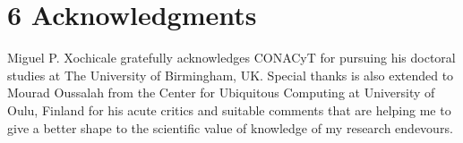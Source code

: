 \documentclass{sigchi}
\begin{document}
%
%
%
%




%
%
%


\section{6 Acknowledgments}
Miguel P. Xochicale gratefully acknowledges
CONACyT
for pursuing his doctoral studies at The University of Birmingham, UK.
Special thanks is also extended to Mourad Oussalah from the Center for
Ubiquitous Computing at University of Oulu, Finland for his acute critics
and suitable comments that are helping me to give a better shape
to the scientific value of knowledge of my research endevours.
\end{document}

